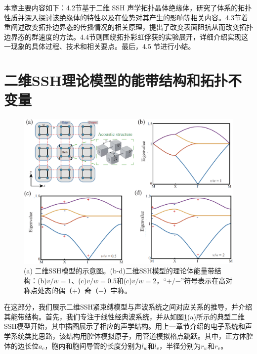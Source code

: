 本章主要内容如下：4.2节基于二维 SSH 声学拓扑晶体绝缘体，研究了体系的拓扑性质并深入探讨该绝缘体的特性以及在位势对其产生的影响等相关内容。4.3节着重阐述改变拓扑边界态的传播情况的相关原理，提出了改变表面阻抗从而改变拓扑边界态的群速度的方法。4.4节则围绕拓扑彩虹俘获的实验展开，详细介绍实现这一现象的具体过程、技术和相关要点。最后，4.5 节进行小结。

\section{二维SSH理论模型的能带结构和拓扑不变量}

\begin{figure}[h!]
    \centering
    \includegraphics[width=1\textwidth]{images/fig4-1.eps} 
    \caption{(a) 二维SSH模型的示意图。(b-d)二维SSH模型的理论体能量带结构：(b)$v/w = 1$、(c)$v/w = 0.5$和(c)$v/w = 2$，“+/−”符号表示在高对称点处态的偶（+）奇（−）宇称。}
    \label{fig_4_1}
  \end{figure}  

在这部分，我们展示二维SSH紧束缚模型与声波系统之间对应关系的推导，并介绍其能带结构。首先，我们专注于线性经典波系统，并从如图\ref{fig_4_1}(a)所示的典型二维SSH模型开始，其中插图展示了相应的声学结构。用上一章节介绍的电子系统和声学系统类比思路，该结构用腔体模拟原子，用管道模拟格点跳跃。其中，正方体腔体的边长位$a_c$，胞内和胞间导管的长度分别为$l_w$和$l_v$，半径分别为$r_w$和$r_v$。

